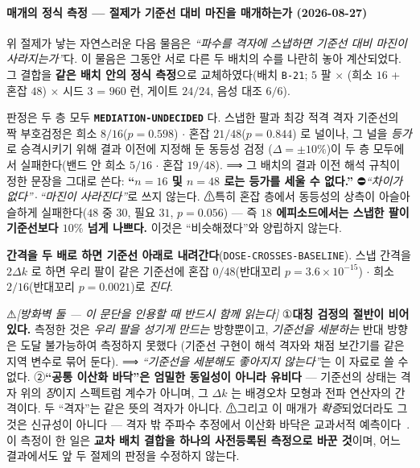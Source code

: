 \documentclass[11pt]{report}
\numberwithin{equation}{chapter}
\numberwithin{figure}{chapter}
\numberwithin{table}{chapter}
\begin{document}
\paragraph{매개의 정식 측정 --- 절제가 기준선 대비 마진을 매개하는가 (2026-08-27)}
\label{sec:mediation}
위 절제가 낳는 자연스러운 다음 물음은 \emph{``파수를 격자에 스냅하면 기준선 대비
마진이 사라지는가''}다. 이 물음은 그동안 서로 다른 두 배치의 수를 나란히 놓아
계산되었다. 그 결합을 \textbf{같은 배치 안의 정식 측정}으로 교체하였다(배치
\texttt{B-21}; $5$ 팔 $\times$ (희소 $16$ + 혼잡 $48$) $\times$ 시드 $3$ = $960$ 런,
게이트 $24/24$, 음성 대조 $6/6$).

판정은 두 층 모두 \textbf{\texttt{MEDIATION-UNDECIDED}} 다. 스냅한 팔과 최강 적격 격자
기준선의 짝 부호검정은 희소 $8/16$($p = 0.598$) $\cdot$ 혼잡 $21/48$($p = 0.844$) 로
널이나, 그 널을 \emph{등가}로 승격시키기 위해 결과 이전에 지정해 둔 동등성 검정
($\Delta = \pm 10\%$)이 두 층 모두에서 실패한다(밴드 안 희소 $5/16$ $\cdot$ 혼잡
$19/48$). ⟹ 그 배치의 결과 이전 해석 규칙이 정한 문장을 그대로 쓴다:
\textbf{``$n = 16$ 및 $n = 48$ 로는 등가를 세울 수 없다.''}
⛔\emph{``차이가 없다''}\,$\cdot$\,\emph{``마진이 사라진다''}로 쓰지 않는다.
⚠특히 혼잡 층에서 동등성의 상측이 아슬아슬하게 실패한다($48$ 중 $30$, 필요 $31$,
$p = 0.056$) --- 즉 \textbf{$18$ 에피소드에서는 스냅한 팔이 기준선보다 $10\%$ 넘게
나쁘다.} 이것은 ``비슷해졌다''와 양립하지 않는다.

\textbf{간격을 두 배로 하면 기준선 아래로 내려간다}(\texttt{DOSE-CROSSES-BASELINE}).
스냅 간격을 $2\Delta k$ 로 하면 우리 팔이 같은 기준선에 혼잡 $0/48$(반대꼬리
$p = 3.6\times10^{-15}$) $\cdot$ 희소 $2/16$(반대꼬리 $p = 0.0021$)로 \emph{진다}.

⚠\emph{[방화벽 둘 --- 이 문단을 인용할 때 반드시 함께 읽는다]}
①\textbf{대칭 검정의 절반이 비어 있다.} 측정한 것은 \emph{우리 팔을 성기게 만드는}
방향뿐이고, \emph{기준선을 세분하는} 반대 방향은 도달 불가능하여 측정하지 못했다
(기준선 구현이 해석 격자와 채점 보간기를 같은 지역 변수로 묶어 둔다).
⟹ \emph{``기준선을 세분해도 좋아지지 않는다''}는 이 자료로 쓸 수 없다.
②\textbf{``공통 이산화 바닥''은 엄밀한 동일성이 아니라 유비다} --- 기준선의 상태는
격자 위의 \emph{장}이지 스펙트럼 계수가 아니며, 그 $\Delta k$ 는 배경오차 모형과 전파
연산자의 간격이다. 두 ``격자''는 같은 뜻의 격자가 아니다.
⚠그리고 이 매개가 \emph{확증}되었더라도 그것은 신규성이 아니다 --- 격자 밖 주파수
추정에서 이산화 바닥은 교과서적 예측이다~\citep{Rife1974}. 이 측정이 한 일은
\textbf{교차 배치 결합을 하나의 사전등록된 측정으로 바꾼 것}이며, 어느 결과에서도
앞 두 절제의 판정을 수정하지 않는다.
\end{document}
